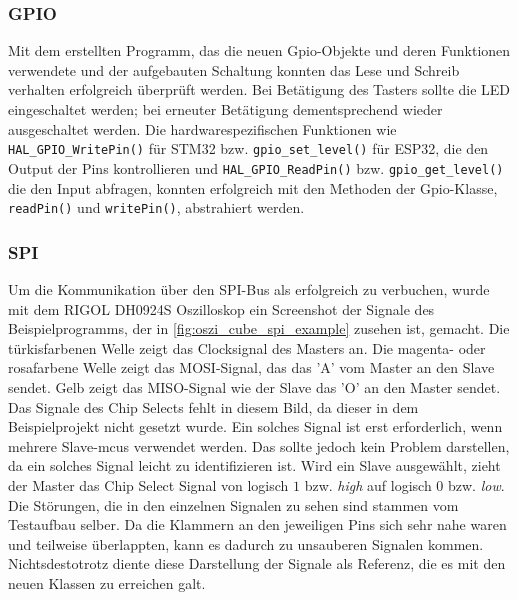 \subsubsection{GPIO}
Mit dem erstellten Programm, das die neuen Gpio-Objekte und deren Funktionen verwendete und der aufgebauten Schaltung konnten das Lese und Schreib verhalten erfolgreich überprüft werden.
Bei Betätigung des Tasters sollte die LED eingeschaltet werden; bei erneuter Betätigung dementsprechend wieder ausgeschaltet werden.
Die hardwarespezifischen Funktionen wie \texttt{HAL\_GPIO\_WritePin()} für STM32 bzw. \texttt{gpio\_set\_level()} für ESP32, die den Output der Pins kontrollieren und \texttt{HAL\_GPIO\_ReadPin()} bzw. \texttt{gpio\_get\_level()} die den Input abfragen,  konnten erfolgreich mit den Methoden der Gpio-Klasse, \texttt{readPin()} und \texttt{writePin()}, abstrahiert werden.

\subsubsection{SPI}
Um die Kommunikation über den SPI-Bus als erfolgreich zu verbuchen, wurde mit dem RIGOL DH0924S Oszilloskop \cite{rigol_dho900} ein Screenshot der Signale des Beispielprogramms, der in \cref{fig:oszi_cube_spi_example} zusehen ist, gemacht.
Die türkisfarbenen Welle zeigt das Clocksignal des Masters an.
Die magenta- oder rosafarbene Welle zeigt das MOSI-Signal, das das 'A' vom Master an den Slave sendet.
Gelb zeigt das MISO-Signal wie der Slave das 'O' an den Master sendet.
Das Signale des Chip Selects fehlt in diesem Bild, da dieser in dem Beispielprojekt nicht gesetzt wurde.
Ein solches Signal ist erst erforderlich, wenn mehrere Slave-\gls{mcu}s verwendet werden.
Das sollte jedoch kein Problem darstellen, da ein solches Signal leicht zu identifizieren ist.
Wird ein Slave ausgewählt, zieht der Master das Chip Select Signal von logisch $1$ bzw. \textit{high} auf logisch $0$ bzw. \textit{low}. 
Die Störungen, die in den einzelnen Signalen zu sehen sind stammen vom Testaufbau selber.
Da die Klammern an den jeweiligen Pins sich sehr nahe waren und teilweise überlappten, kann es dadurch zu unsauberen Signalen kommen.
Nichtsdestotrotz diente diese Darstellung der Signale als Referenz, die es mit den neuen Klassen zu erreichen galt.

